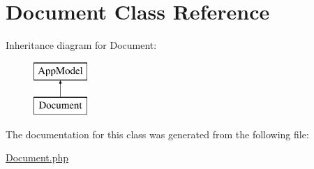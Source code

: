 \hypertarget{classDocument}{
\section{\-Document \-Class \-Reference}
\label{classDocument}
}
\-Inheritance diagram for \-Document\-:\begin{figure}[H]
\begin{center}
\leavevmode
\includegraphics[height=2.000000cm]{classDocument}
\end{center}
\end{figure}


\-The documentation for this class was generated from the following file\-:\begin{DoxyCompactItemize}
\item 
\hyperlink{Document_8php}{\-Document.\-php}\end{DoxyCompactItemize}
